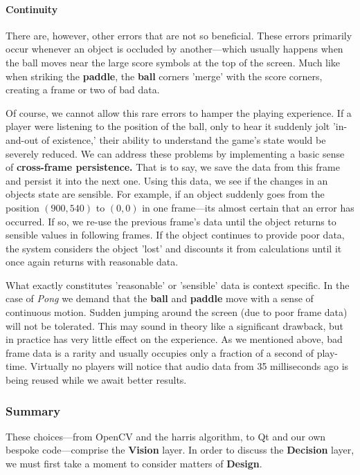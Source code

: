 \documentclass{report}
\newcommand{\design}{\textbf{Design}\xspace}
\newcommand{\vision}{\textbf{Vision}\xspace}
\newcommand{\decision}{\textbf{Decision}\xspace}
\newcommand{\pad}{\textbf{paddle}\xspace}
\newcommand{\ball}{\textbf{ball}\xspace}
\newcommand{\tech}[1]{\textbf{#1}}
\begin{document}
\paragraph{Continuity}

There are, however, other errors that are not so beneficial. These errors primarily occur whenever an object is occluded by another---which usually happens when the ball moves near the large score symbols at the top of the screen. Much like when striking the \pad, the \ball corners 'merge' with the score corners, creating a frame or two of bad data. 

Of course, we cannot allow this rare errors to hamper the playing experience. If a player were listening to the position of the ball, only to hear it suddenly jolt 'in-and-out of existence,' their ability to understand the game's state would be severely reduced. We can address these problems by implementing a basic sense of \tech{cross-frame persistence.} That is to say, we save the data from this frame and persist it into the next one. Using this data, we see if the changes in an objects state are sensible. For example, if an object suddenly goes from the position $(900, 540)$ to $(0, 0)$ in one frame---its almost certain that an error has occurred. If so, we re-use the previous frame's data until the object returns to sensible values in following frames. If the object continues to provide poor data, the system considers the object 'lost' and discounts it from calculations until it once again returns with reasonable data. 

What exactly constitutes 'reasonable' or 'sensible' data is context specific. In the case of \emph{Pong} we demand that the \ball and \pad move with a sense of continuous motion. Sudden jumping around the screen (due to poor frame data) will not be tolerated. This may sound in theory like a significant drawback, but in practice has very little effect on the experience. As we mentioned above, bad frame data is a rarity and usually occupies only a fraction of a second of play-time. Virtually no players will notice that audio data from 35 milliseconds ago is being reused while we await better results. 

\subsubsection{Summary}
These choices---from OpenCV and the harris algorithm, to Qt and our own bespoke code---comprise the \vision layer. In order to discuss the \decision layer, we must first take a moment to consider matters of \design.
\end{document}
